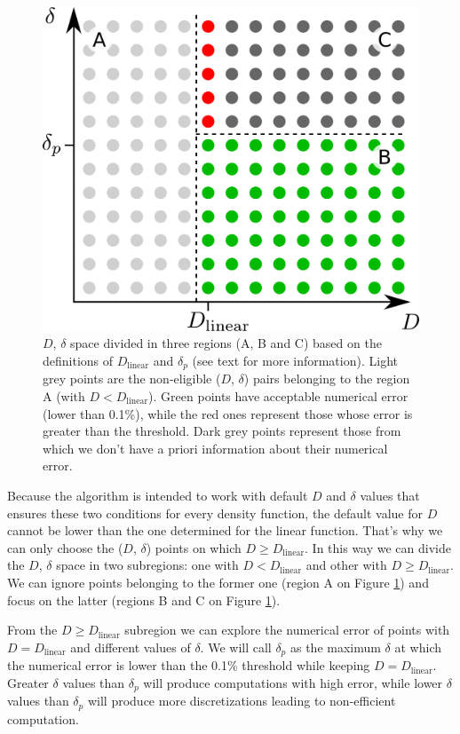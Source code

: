 \documentclass[extra]{gji}
\begin{document}
\begin{figure}
\centering
\includegraphics[width=\linewidth]
    {figures/D-delta-grid-search.pdf}
\caption{
    $D$, $\delta$ space divided in three regions (A, B and C) based on 
    the definitions of $D_\text{linear}$ and $\delta_p$ (see text for more 
    information).
    Light grey points are the non-eligible ($D$, $\delta$) pairs 
    belonging to the region A (with $D < D_\text{linear}$).
    Green points have acceptable numerical error (lower than 0.1\%), 
    while the red ones represent those whose error is greater than the 
    threshold.
    Dark grey points represent those from which we don't have a priori 
    information about their numerical error.}
\label{fig:D-delta-grid-search}
\end{figure}

Because the algorithm is intended to work with default $D$ and $\delta$ 
values that ensures these two conditions for every density function, 
the default value for $D$ cannot be lower than the one determined for 
the linear function.
That's why we can only choose the ($D$, $\delta$) points on which
$D \geq D_\text{linear}$.
In this way we can divide the $D$, $\delta$ space in two subregions: 
one with $D < D_\text{linear}$ and other with $D \ge D_\text{linear}$.
We can ignore points belonging to the former one (region A on Figure 
\ref{fig:D-delta-grid-search}) and focus on the latter (regions B and C 
on Figure \ref{fig:D-delta-grid-search}).

From the $D \ge D_\text{linear}$ subregion we can explore the numerical 
error of points with $D = D_\text{linear}$ and different values of 
$\delta$.
We will call $\delta_p$ as the maximum $\delta$ at which the numerical 
error is lower than the 0.1\% threshold while keeping
$D = D_ \text{linear}$.
Greater $\delta$ values than $\delta_p$ will produce computations 
with high error, while lower $\delta$ values than $\delta_p$ will 
produce more discretizations leading to non-efficient computation.
\end{document}
